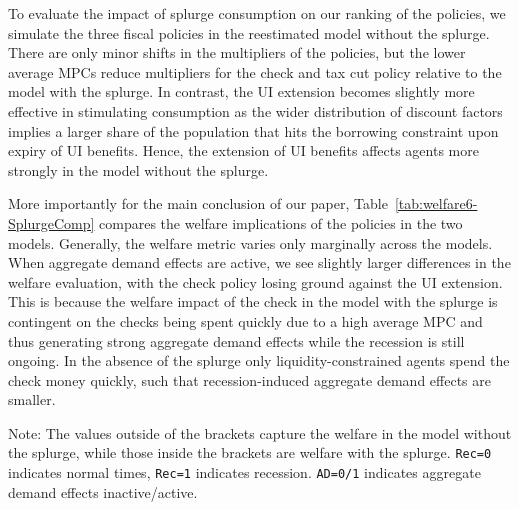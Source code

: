 \documentclass[qe,draft]{econsocart}
\theoremstyle{plain}
\theoremstyle{definition}
\begin{document}
To evaluate the impact of splurge consumption on our ranking of the policies, we simulate the three fiscal policies in the reestimated model without the splurge.
There are only minor shifts in the multipliers of the policies, but the lower average MPCs reduce multipliers for the check and tax cut policy relative to the model with the splurge.
In contrast, the UI extension becomes slightly more effective in stimulating consumption as the wider distribution of discount factors implies a larger share of the population that hits the borrowing constraint upon expiry of UI benefits.
Hence, the extension of UI benefits affects agents more strongly in the model without the splurge.

More importantly for the main conclusion of our paper, Table~\ref{tab:welfare6-SplurgeComp} compares the welfare implications of the policies in the two models.
Generally, the welfare metric varies only marginally across the models.
When aggregate demand effects are active, we see slightly larger differences in the welfare evaluation, with the check policy losing ground against the UI extension.
This is because the welfare impact of the check in the model with the splurge is contingent on the checks being spent quickly due to a high average MPC and thus generating strong aggregate demand effects while the recession is still ongoing.
In the absence of the splurge only liquidity-constrained agents spend the check money quickly, such that recession-induced aggregate demand effects are smaller.

\begin{table}[tb] 
  \caption{\pregenmark Welfare for policies both out of and in a recession, with/without AD effects}
  \label{tab:welfare6-SplurgeComp} %
  \centering


  \noindent\parbox{\textwidth}{
    \medskip
    \footnotesize Note: The values outside of the brackets capture the welfare in the model without the splurge, while those inside the brackets are welfare with the splurge. \texttt{Rec=0} indicates normal times, \texttt{Rec=1} indicates recession. \texttt{AD=0/1} indicates aggregate demand effects inactive/active.
  }
\end{table}
\end{document}
